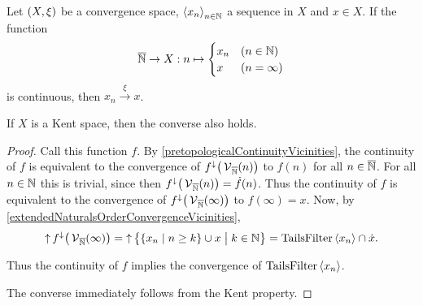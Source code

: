 \begin{lemma} \label{continuitySequenceAsFunction}
Let $\sSet{X,\xi}$ be a convergence space, $\left\langle x_n \right\rangle_{n\in \mathbb{N}}$ a sequence in $X$ and $x\in X$. If the function
\[ \overline{\mathbb{N}} \to X: n \mapsto \begin{cases}
x_n & (n\in \mathbb{N}) \\
x & (n = \infty)
\end{cases} \]
is continuous, then $x_n \overset{\xi}{\longrightarrow} x$.

If $X$ is a Kent space, then the converse also holds.
\end{lemma}
\begin{proof}
Call this function $f$. By \ref{pretopologicalContinuityVicinities}, the continuity of $f$ is equivalent to the convergence of $f^\downarrow\big(\operatorname{\mathcal{V}}_{\overline{\mathbb{N}}}(n)\big)$ to $f(n)$ for all $n\in \overline{\mathbb{N}}$. For all $n\in \mathbb{N}$ this is trivial, since then $f^\downarrow\big(\operatorname{\mathcal{V}}_{\overline{\mathbb{N}}}(n)\big) = \dot{f}(n)$.
Thus the continuity of $f$ is equivalent to the convergence of $f^\downarrow\big(\operatorname{\mathcal{V}}_{\overline{\mathbb{N}}}(\infty)\big)$ to $f(\infty) = x$.
Now, by \ref{extendedNaturalsOrderConvergenceVicinities},
\[ \upset f^\imf\big(\vicinities_{\overline{\N}}(\infty)\big) = \upset \setbuilder[\big]{\setbuilder{x_n}{n\geq k}\cup x}{k\in \N} = \TailsFilter\seq{x_n}\cap \pfilter{x}. \]

Thus the continuity of $f$ implies the convergence of $\operatorname{TailsFilter}\left\langle x_n \right\rangle$.

The converse immediately follows from the Kent property.
\end{proof}


